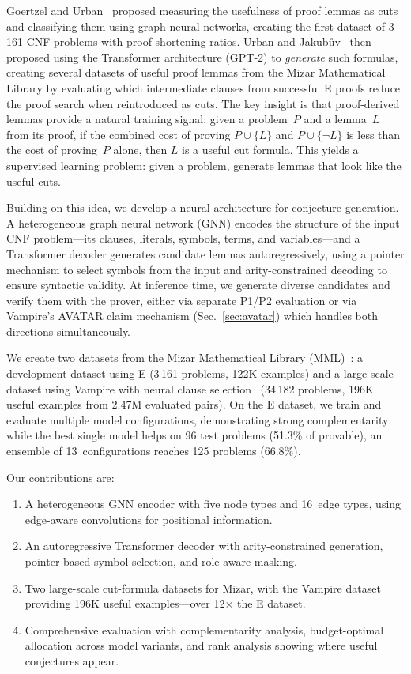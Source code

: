 \documentclass{easychair}
\newcommand{\Eprover}{E\xspace}
\newcommand{\Vampire}{Vampire\xspace}
\newcommand{\Mizar}{Mizar\xspace}
\newcommand{\MML}{MML\xspace}
\begin{document}
Goertzel and Urban~\cite{Urban2019} proposed measuring the usefulness
of proof lemmas as cuts and classifying them using graph neural networks,
creating the first dataset of 3\,161 CNF problems with proof shortening
ratios.  Urban and Jakub\r{u}v~\cite{Urban2020} then proposed using
the Transformer architecture (GPT-2) to \emph{generate} such formulas,
creating several datasets of useful proof lemmas
from the \Mizar Mathematical Library by evaluating which intermediate
clauses from successful \Eprover proofs reduce the proof search when
reintroduced as cuts.  The key insight is that proof-derived lemmas
provide a natural training signal: given a problem~$P$ and a lemma~$L$
from its proof, if the combined cost of proving $P \cup \{L\}$ and
$P \cup \{\neg L\}$ is less than the cost of proving~$P$ alone, then
$L$ is a useful cut formula.  This yields a supervised learning
problem: given a problem, generate lemmas that look like the useful
cuts.

Building on this idea, we develop a neural architecture for
conjecture generation.  A heterogeneous graph neural network (GNN)
encodes the structure of the input CNF problem---its clauses,
literals, symbols, terms, and variables---and a Transformer decoder
generates candidate lemmas autoregressively, using a pointer mechanism
to select symbols from the input and arity-constrained decoding to
ensure syntactic validity.  At inference time, we generate diverse
candidates and verify them with the prover, either via separate
P1/P2 evaluation or via \Vampire's AVATAR claim mechanism
(Sec.~\ref{sec:avatar}) which handles both directions simultaneously.

We create two datasets from the \Mizar Mathematical Library
(\MML)~\cite{Grabowski2010}: a development dataset using \Eprover
(3\,161 problems, 122K examples) and a large-scale dataset using
\Vampire with neural clause selection~\cite{Suda2025} (34\,182
problems, 196K useful examples from 2.47M evaluated pairs).  On the
\Eprover dataset, we train and evaluate multiple model configurations,
demonstrating strong complementarity: while the best single model
helps on 96 test problems (51.3\% of provable), an ensemble of
13~configurations reaches 125 problems (66.8\%).

Our contributions are:
\begin{enumerate}
\item A heterogeneous GNN encoder with five node types and 16~edge
  types, using edge-aware convolutions for positional information.
\item An autoregressive Transformer decoder with arity-constrained
  generation, pointer-based symbol selection, and role-aware masking.
\item Two large-scale cut-formula datasets for \Mizar, with the
  \Vampire dataset providing 196K useful examples---over 12$\times$
  the \Eprover dataset.
\item Comprehensive evaluation with complementarity analysis,
  budget-optimal allocation across model variants, and rank analysis
  showing where useful conjectures appear.
\end{enumerate}
\end{document}

